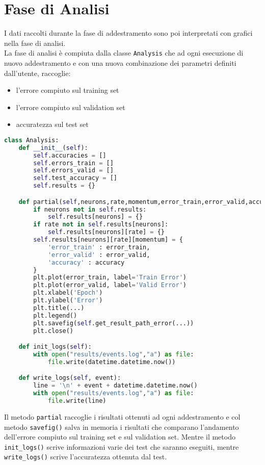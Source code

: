 \section{Fase di Analisi}
I dati raccolti durante la fase di addestramento sono poi interpretati con grafici nella fase di analisi. \\
La fase di analisi è compiuta dalla classe \texttt{Analysis} che ad ogni esecuzione di nuovo addestramento e con una nuova combinazione dei parametri definiti dall'utente, raccoglie: 
\begin{itemize}
    \item l'errore compiuto sul training set
    \item l'errore compiuto sul validation set
    \item accuratezza sul test set
\end{itemize}
\begin{lstlisting}[language=Python]
class Analysis:
    def __init__(self):
        self.accuracies = []
        self.errors_train = []
        self.errors_valid = []
        self.test_accuracy = []
        self.results = {}

    def partial(self,neurons,rate,momentum,error_train,error_valid,accuracy):
        if neurons not in self.results:
            self.results[neurons] = {}
        if rate not in self.results[neurons]:
            self.results[neurons][rate] = {}
        self.results[neurons][rate][momentum] = {
            'error_train' : error_train,
            'error_valid' : error_valid,
            'accuracy' : accuracy
        }
        plt.plot(error_train, label='Train Error')
        plt.plot(error_valid, label='Valid Error')
        plt.xlabel('Epoch')
        plt.ylabel('Error')
        plt.title(...)
        plt.legend()
        plt.savefig(self.get_result_path_error(...))
        plt.close()

    def init_logs(self):
        with open("results/events.log","a") as file:
            file.write(datetime.datetime.now())

    def write_logs(self, event):
        line = '\n' + event + datetime.datetime.now()
        with open("results/events.log","a") as file:
            file.write(line)
\end{lstlisting}
Il metodo \texttt{partial} raccoglie i risultati ottenuti ad ogni addestramento e col metodo \texttt{savefig()} salva in memoria i risultati che comparano l'andamento dell'errore compiuto sul training set e sul validation set. Mentre il metodo \texttt{init\_logs()} scrive informazioni varie dei test che saranno eseguiti, mentre \texttt{write\_logs()} scrive l'accuratezza ottenuta dal test.
